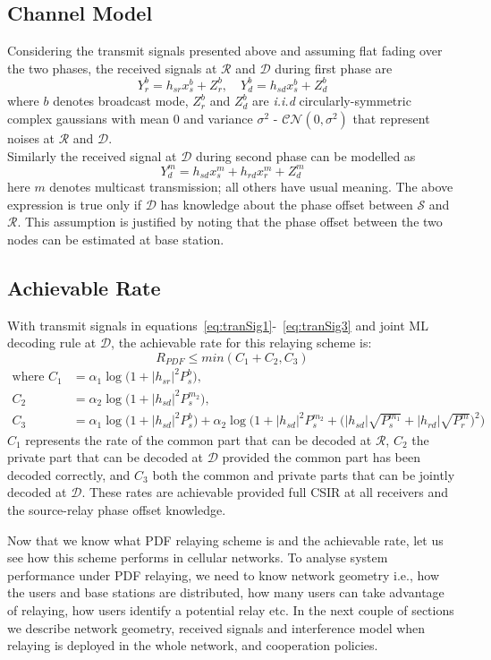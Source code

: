 \documentclass[titlepage]{article}
\begin{document}
\subsection{Channel Model}
Considering the transmit signals presented above and assuming flat fading over the two phases, the received signals at $\mathcal{R}$ and $\mathcal{D}$ during first phase are 
\begin{equation}
Y_r^b = h_{sr}x^b_s + Z_r^b , \quad Y_d^b = h_{sd}x^b_s + Z_d^b
\end{equation}
where $b$ denotes broadcast mode, $Z_r^b$ and $Z_d^b$ are \textit{i.i.d} circularly-symmetric complex gaussians with mean 0 and variance $\sigma^2$  - $\mathcal{CN}(0,\sigma^2)$ that represent noises at $\mathcal{R}$ and $\mathcal{D}$. \\
Similarly the received signal at $\mathcal{D}$ during second phase can be modelled as 
\begin{equation}
Y_d^m = h_{sd}x^m_s + h_{rd}x_r^m + Z_d^m
\end{equation}
here $m$ denotes multicast transmission; all others have usual meaning.
The above expression is true only if $\mathcal{D}$ has knowledge about the phase offset between $\mathcal{S}$ and $\mathcal{R}$. This assumption is justified by noting that the phase offset between the two nodes can be estimated at base station.

\subsection{Achievable Rate}
With transmit signals in equations~\ref{eq:tranSig1}-~\ref{eq:tranSig3} and joint ML decoding rule at $\mathcal{D}$, the achievable rate for this relaying scheme is:
\begin{equation}
R_{PDF} \leq min(C_1+C_2,C_3)
\end{equation}
\begin{align}
\text{where } C_1 &= \alpha_1 \log\Big(1+|h_{sr}|^2P_s^b\Big),\\
C_2 &= \alpha_2 \log\Big(1+|h_{sd}|^2P_s^{m_2}\Big),\\
C_3 &= \alpha_1 \log\Big(1+|h_{sd}|^2P_s^b\Big) + \alpha_2\log\bigg(1+|h_{sd}|^2P_s^{m_2} + \Big(|h_{sd}|\sqrt{P_s^{m_1}} + |h_{rd}|\sqrt{P_r^m}\Big)^2\bigg)
\end{align}
$C_1$ represents the rate of the common part that can be decoded at $\mathcal{R}$, $C_2$  the private part that can be decoded at $\mathcal{D}$ provided the common part has been decoded correctly, and $C_3$ both the common and private parts that can be jointly decoded at $\mathcal{D}$. These rates are achievable provided full CSIR at all receivers and the source-relay phase offset knowledge.
\par
Now that we know what PDF relaying scheme is and the achievable rate, let us see how this scheme performs in cellular networks. To analyse system performance under PDF relaying, we need to know network geometry i.e., how the users and base stations are distributed, how many users can take advantage of relaying, how users identify a potential relay etc. In the next couple of sections we describe network geometry,  received signals and interference model when relaying is deployed in the whole network, and cooperation policies.
\end{document}
